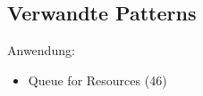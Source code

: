 \subsection{Verwandte Patterns}

Anwendung:
\begin{itemize}
	\item Queue for Resources (46)
\end{itemize}

